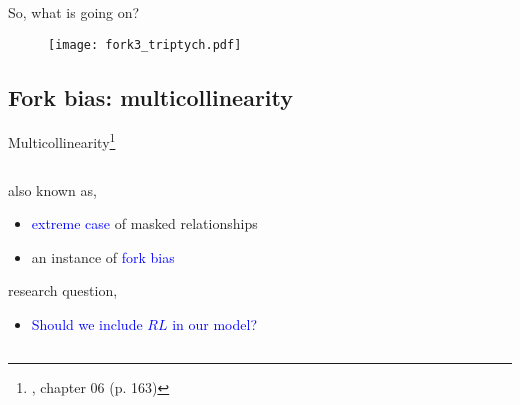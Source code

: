 %
%
\begin{frame}
	{So, what is going on?}
	
	\begin{figure*}
		\texttt{[image: fork3\_triptych.pdf]}
	\end{figure*}
\end{frame}
%
%
\subsection{Fork bias: multicollinearity}
%
%
\begin{frame}[t, negative]
	\subsectionpage
\end{frame}
%
%
\begin{frame}
	{Multicollinearity\footnote{\citet{McElreath_2020}, chapter 06 (p. 163)}}
	\begin{columns}
		\begin{column}{0.5\textwidth}
			also known as,
			\begin{itemize}
				\item \textcolor{blue}{extreme case} of masked relationships
				\item an instance of \textcolor{blue}{fork bias}
			\end{itemize}
			
			research question, 
			\begin{itemize}
				\item \textcolor{blue}{Should we include $RL$ in our model?}
			\end{itemize}
			

\end{column}
\end{columns}
\end{frame}
